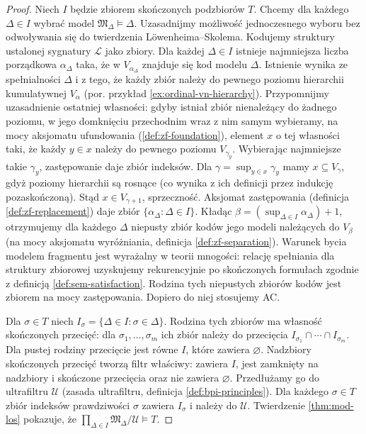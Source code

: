 \begin{proof}
Niech $I$ będzie zbiorem skończonych podzbiorów $T$.
Chcemy dla każdego $\Delta\in I$ wybrać model
$\mathfrak M_\Delta\models\Delta$. Uzasadnijmy możliwość jednoczesnego wyboru bez odwoływania
się do twierdzenia Löwenheima--Skolema. Kodujemy struktury
ustalonej sygnatury $\mathcal L$ jako zbiory. Dla każdej
$\Delta\in I$ istnieje najmniejsza liczba porządkowa
$\alpha_\Delta$ taka, że w $V_{\alpha_\Delta}$ znajduje się
kod modelu $\Delta$. Istnienie wynika ze spełnialności
$\Delta$ i z tego, że każdy zbiór należy do pewnego poziomu
hierarchii kumulatywnej $V_\alpha$ (por. przykład
\ref{ex:ordinal-vn-hierarchy}). Przypomnijmy uzasadnienie
ostatniej własności: gdyby istniał zbiór nienależący do żadnego
poziomu, w jego domknięciu przechodnim wraz z nim samym
wybieramy, na mocy aksjomatu ufundowania
(\ref{def:zf-foundation}), element $x$ o tej własności taki,
że każdy $y\in x$ należy do pewnego poziomu $V_{\gamma_y}$.
Wybierając najmniejsze takie $\gamma_y$, zastępowanie daje
zbiór indeksów. Dla $\gamma=\sup_{y\in x}\gamma_y$ mamy
$x\subseteq V_\gamma$, gdyż poziomy hierarchii są rosnące
(co wynika z ich definicji przez indukcję pozaskończoną).
Stąd $x\in V_{\gamma+1}$, sprzeczność. Aksjomat zastępowania
(definicja \ref{def:zf-replacement}) daje zbiór
$\{\alpha_\Delta:\Delta\in I\}$. Kładąc
$\beta=(\sup_{\Delta\in I}\alpha_\Delta)+1$, otrzymujemy dla
każdego $\Delta$ niepusty zbiór kodów jego modeli należących
do $V_\beta$ (na mocy aksjomatu wyróżniania, definicja
\ref{def:zf-separation}). Warunek bycia modelem fragmentu
jest wyrażalny w teorii mnogości: relację spełniania
dla struktury zbiorowej uzyskujemy rekurencyjnie po skończonych
formułach zgodnie z definicją \ref{def:sem-satisfaction}.
Rodzina tych niepustych zbiorów kodów jest zbiorem
na mocy zastępowania. Dopiero do niej stosujemy AC.

Dla $\sigma\in T$ niech $I_\sigma=\{\Delta\in I:\sigma\in\Delta\}$.
Rodzina tych zbiorów ma własność skończonych przecięć:
dla $\sigma_1,\ldots,\sigma_m$ ich zbiór należy do przecięcia
$I_{\sigma_1}\cap\cdots\cap I_{\sigma_m}$.
Dla pustej rodziny przecięcie jest równe $I$, które zawiera
$\varnothing$. Nadzbiory skończonych przecięć tworzą filtr
właściwy: zawiera $I$, jest zamknięty na nadzbiory i skończone
przecięcia oraz nie zawiera $\varnothing$. Przedłużamy go do ultrafiltru
$\mathcal U$ (zasada ultrafiltru, definicja \ref{def:bpi-principles}).
Dla każdego $\sigma\in T$ zbiór indeksów prawdziwości $\sigma$
zawiera $I_\sigma$ i należy do $\mathcal U$. Twierdzenie
\ref{thm:mod-los} pokazuje, że
$\prod_{\Delta\in I}\mathfrak M_\Delta/\mathcal U\models T$.
\end{proof}


